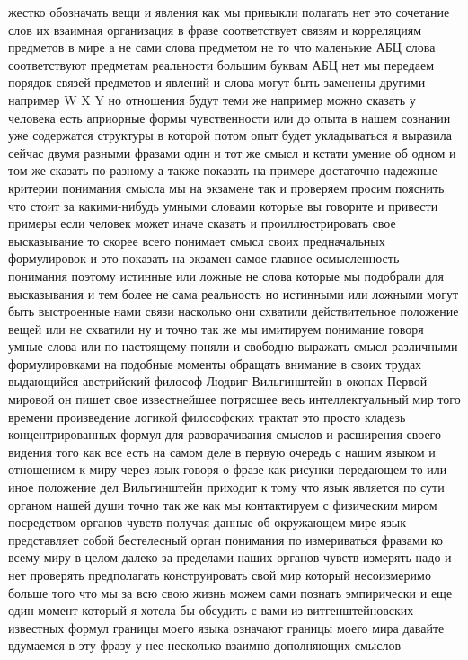 жестко обозначать вещи и явления как мы привыкли полагать нет это сочетание слов
их взаимная организация в фразе соответствует связям и корреляциям предметов в
мире а не сами слова предметом не то что маленькие АБЦ слова соответствуют
предметам реальности большим буквам АБЦ нет мы передаем порядок связей предметов
и явлений и слова могут быть заменены другими например W X Y но отношения будут
теми же например можно сказать у человека есть априорные формы чувственности или
до опыта в нашем сознании уже содержатся структуры в которой потом опыт будет
укладываться я выразила сейчас двумя разными фразами один и тот же смысл и
кстати умение об одном и том же сказать по разному а также показать на примере
достаточно надежные критерии понимания смысла мы на экзамене так и проверяем
просим пояснить что стоит за какими-нибудь умными словами которые вы говорите и
привести примеры если человек может иначе сказать и проиллюстрировать свое
высказывание то скорее всего понимает смысл своих предначальных формулировок и
это показать на экзамен самое главное осмысленность понимания поэтому истинные
или ложные не слова которые мы подобрали для высказывания и тем более не сама
реальность но истинными или ложными могут быть выстроенные нами связи насколько
они схватили действительное положение вещей или не схватили ну и точно так же мы
имитируем понимание говоря умные слова или по-настоящему поняли и свободно
выражать смысл различными формулировками на подобные моменты обращать внимание в
своих трудах выдающийся австрийский философ Людвиг Вильгинштейн в окопах Первой
мировой он пишет свое известнейшее потрясшее весь интеллектуальный мир того
времени произведение логикой философских трактат это просто кладезь
концентрированных формул для разворачивания смыслов и расширения своего видения
того как все есть на самом деле в первую очередь с нашим языком и отношением к
миру через язык говоря о фразе как рисунки передающем то или иное положение дел
Вильгинштейн приходит к тому что язык является по сути органом нашей души точно
так же как мы контактируем с физическим миром посредством органов чувств получая
данные об окружающем мире язык представляет собой бестелесный орган понимания по
измериваться фразами ко всему миру в целом далеко за пределами наших органов
чувств измерять надо и нет проверять предполагать конструировать свой мир
который несоизмеримо больше того что мы за всю свою жизнь можем сами познать
эмпирически и еще один момент который я хотела бы обсудить с вами из
витгенштейновских известных формул границы моего языка означают границы моего
мира давайте вдумаемся в эту фразу у нее несколько взаимно дополняющих смыслов
